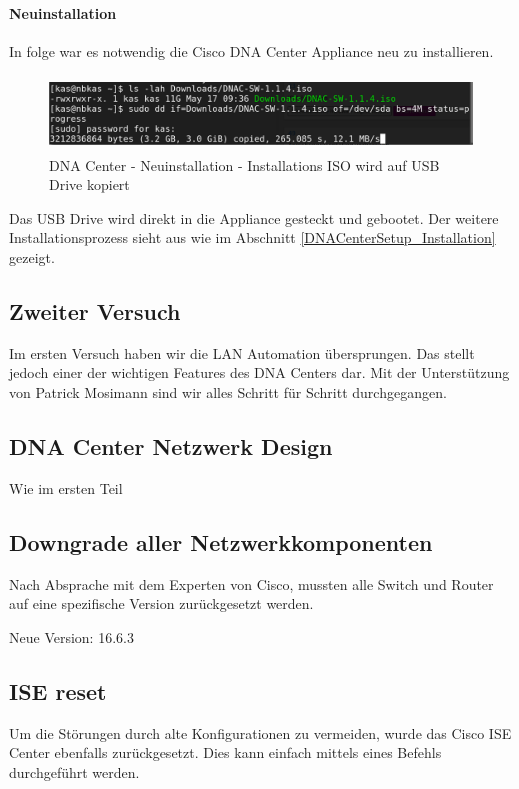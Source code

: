\paragraph{Neuinstallation}
In folge war es notwendig die Cisco DNA Center Appliance neu zu installieren. 

\begin{figure}[H]
	\centering
	\includegraphics[height=2cm]{img/dna-center-reset-iso.png}
	\caption{DNA Center - Neuinstallation - Installations ISO wird auf USB Drive kopiert}
	\label{fig:dna-center-iso-1}
\end{figure}

Das USB Drive wird direkt in die Appliance gesteckt und gebootet. Der weitere Installationsprozess sieht aus wie im Abschnitt \ref{DNACenterSetup_Installation} gezeigt. 


\subsection{Zweiter Versuch}
Im ersten Versuch haben wir die LAN Automation übersprungen. Das stellt jedoch einer der wichtigen Features des DNA Centers dar. Mit der Unterstützung von Patrick Mosimann sind wir alles Schritt für Schritt durchgegangen. 

\subsection{DNA Center Netzwerk Design}
Wie im ersten Teil

\subsection{Downgrade aller Netzwerkkomponenten}
Nach Absprache mit dem Experten von Cisco, mussten alle Switch und Router auf eine spezifische Version zurückgesetzt werden.

Neue Version: 16.6.3

\subsection{ISE reset}
Um die Störungen durch alte Konfigurationen zu vermeiden, wurde das Cisco ISE Center ebenfalls zurückgesetzt. Dies kann einfach mittels eines Befehls durchgeführt werden.

